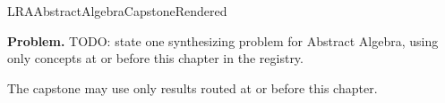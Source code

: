 \ifcsname LRAAbstractAlgebraCapstoneRendered\endcsname
\else
\expandafter\gdef\csname LRAAbstractAlgebraCapstoneRendered\endcsname{}

\newpage
{}
\label{cap:abstract-algebra}

\begin{tcolorbox}[
  colback=gray!6,
  colframe=gray!40,
  arc=2pt,
  left=8pt, right=8pt, top=6pt, bottom=6pt,
  title={\small\textbf{Capstone Problem}},
  fonttitle=\small\bfseries
]
\textbf{Problem.}
TODO: state one synthesizing problem for Abstract Algebra, using only concepts at or
before this chapter in the registry.
\end{tcolorbox}

\begin{remark*}
The capstone may use only results routed at or before this chapter.
\end{remark*}

\clearpage
\fi

